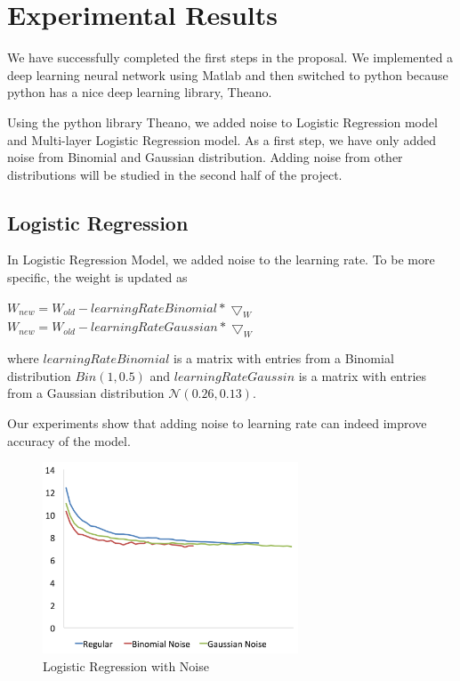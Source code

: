 \section{Experimental Results}
\label{sec:result}

We have successfully completed the first steps in the proposal.
We implemented a deep learning neural network using Matlab and then
switched to python because python has a nice deep learning library,
Theano.

Using the python library Theano, we added noise to Logistic Regression
model and Multi-layer Logistic Regression model.
As a first step, we have only added noise from Binomial and Gaussian
distribution. Adding noise from other distributions will be studied in
the second half of the project.

\subsection{Logistic Regression}
In Logistic Regression Model, we added noise to the learning rate.
To be more specific, the weight is updated as

\begin{center}
$W_{new} = W_{old} - learningRateBinomial * \bigtriangledown_{W}$
$W_{new} = W_{old} - learningRateGaussian * \bigtriangledown_{W}$
\end{center}

where $learningRateBinomial$ is a matrix with entries from a Binomial
distribution $Bin(1,0.5)$ and $learningRateGaussin$ is a matrix with entries
from a Gaussian distribution $\mathcal{N}(0.26,0.13)$.

Our experiments show that adding noise to learning rate can indeed
improve accuracy of the model.

\begin{figure}[h]
\centering
\includegraphics[width=215pt]{figs/logistic_sgd_all.png}
\caption{Logistic Regression with Noise}
\label{fig:logistic-sgd}
\end{figure}

